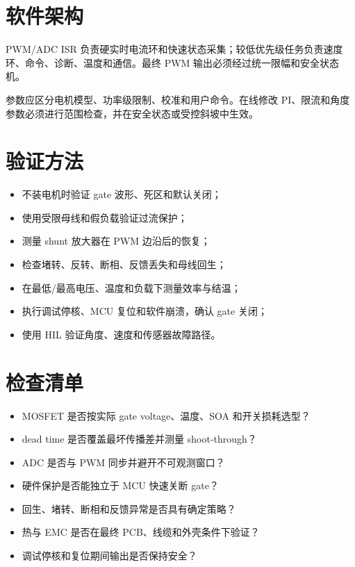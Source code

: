 \section{软件架构}

PWM/ADC ISR 负责硬实时电流环和快速状态采集；较低优先级任务负责速度环、命令、诊断、温度和通信。最终 PWM 输出必须经过统一限幅和安全状态机。

参数应区分电机模型、功率级限制、校准和用户命令。在线修改 PI、限流和角度参数必须进行范围检查，并在安全状态或受控斜坡中生效。

\section{验证方法}

\begin{itemize}
  \item 不装电机时验证 gate 波形、死区和默认关闭；
  \item 使用受限母线和假负载验证过流保护；
  \item 测量 shunt 放大器在 PWM 边沿后的恢复；
  \item 检查堵转、反转、断相、反馈丢失和母线回生；
  \item 在最低/最高电压、温度和负载下测量效率与结温；
  \item 执行调试停核、MCU 复位和软件崩溃，确认 gate 关闭；
  \item 使用 HIL 验证角度、速度和传感器故障路径。
\end{itemize}

\section{检查清单}

\begin{itemize}
  \item MOSFET 是否按实际 gate voltage、温度、SOA 和开关损耗选型？
  \item dead time 是否覆盖最坏传播差并测量 shoot-through？
  \item ADC 是否与 PWM 同步并避开不可观测窗口？
  \item 硬件保护是否能独立于 MCU 快速关断 gate？
  \item 回生、堵转、断相和反馈异常是否具有确定策略？
  \item 热与 EMC 是否在最终 PCB、线缆和外壳条件下验证？
  \item 调试停核和复位期间输出是否保持安全？
\end{itemize}
